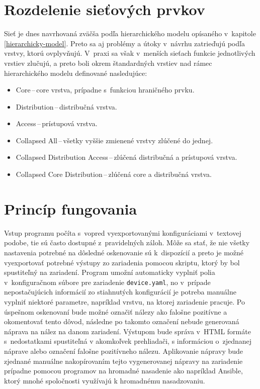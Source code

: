 \section{Rozdelenie sieťových prvkov}
\label{hierarchydesign}
Sieť je dnes navrhovaná zväčša podľa hierarchického modelu opísaného v~kapitole \ref{hierarchicky-model}. Preto sa aj problémy a útoky v~návrhu zatrieďujú podľa vrstvy, ktorú ovplyvňujú. V~praxi sa však v~menších sieťach funkcie jednotlivých vrstiev zlučujú, a preto boli okrem štandardných vrstiev nad rámec hierarchického modelu definované nasledujúce:

\begin{itemize}
	\item Core\,--\,core vrstva, prípadne s~funkciou hraničného prvku.
	\item Distribution\,--\,distribučná vrstva.
	\item Access\,--\,prístupová vrstva.
	\item Collapsed All\,--\,všetky vyššie zmienené vrstvy zlúčené do jednej.
	\item Collapsed Distribution Access\,--\,zlúčená distribučná a prístupová vrstva.
	\item Collapsed Core Distribution\,--\,zlúčená core a distribučná vrstva.
\end{itemize}

\section{Princíp fungovania}

Vstup programu počíta s~vopred vyexportovanými konfiguráciami v~textovej podobe, tie sú často dostupné z~pravidelných záloh. Môže sa stať, že nie všetky nastavenia potrebné na dôsledné oskenovanie sú k~dispozícií a preto je možné vyexportovať potrebné výstupy zo zariadenia pomocou skriptu, ktorý by bol spustiteľný na zariadení. Program umožní automaticky vyplniť polia v~konfiguračnom súbore pre zariadenie \texttt{device.yaml}, no v~prípade nepostačujúcich informácií zo stiahnutých konfigurácií je potreba manuálne vyplniť niektoré parametre, napríklad vrstvu, na ktorej zariadenie pracuje. Po úspešnom oskenovaní bude možné označiť nálezy ako falošne pozitívne a okomentovať tento dôvod, následne po takomto označení nebude generovaná náprava na nález na danom zariadení. Výstupom bude správa v~HTML formáte s~nedostatkami spustiteľná v akomkoľvek prehliadači, s informáciou o~zjednanej náprave alebo označení falošne pozitívneho nálezu. Aplikovanie nápravy bude zjednané manuálne nakopírovaním tejto vygenerovanej nápravy na zariadenie prípadne pomocou programov na hromadné nasadenie ako napríklad Ansible, ktorý mnohé spoločnosti využívajú k hromadnému nasadzovaniu. 


